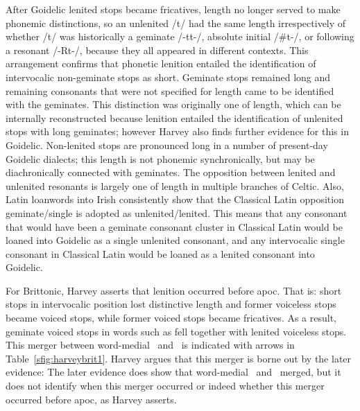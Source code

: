 After Goidelic lenited stops became fricatives, length no longer served to make phonemic distinctions, so an unlenited /t/ had the same length irrespectively of whether /t/ was historically a geminate /-tt-/, absolute initial /\#t-/, or following a resonant /-Rt-/, because they all appeared in different contexts. This arrangement confirms that phonetic lenition entailed the identification of intervocalic non-geminate stops as short. Geminate stops remained long and remaining consonants that were not specified for length came to be identified with the geminates. This distinction was originally one of length, which can be internally reconstructed because lenition entailed the identification of unlenited stops with long geminates; however Harvey also finds further evidence for this in Goidelic. Non-lenited stops are pronounced long in a number of present-day Goidelic dialects; this length is not phonemic synchronically, but may be diachronically connected with geminates. The opposition between lenited and unlenited resonants is largely one of length in multiple branches of Celtic. Also, Latin loanwords into Irish consistently show that the Classical Latin opposition geminate/single is adopted as unlenited/lenited. This means that any consonant that would have been a geminate consonant cluster in Classical Latin would be loaned into Goidelic as a single unlenited consonant, and any intervocalic single consonant in Classical Latin would be loaned as a lenited consonant into Goidelic.

For Brittonic, Harvey asserts that  lenition  occurred before \gls{apoc}. That is: short stops in intervocalic position lost distinctive length and former voiceless stops became voiced stops, while former voiced stops became fricatives. As a result, geminate voiced stops in words such as  fell together with lenited voiceless stops. This merger between word-medial \xD\ and \lT\ is indicated with arrows in Table~\ref{sfig:harveybrit1}. Harvey argues that this merger is borne out by the later evidence:
The later evidence does show that word-medial \xD\ and \lT\ merged, but it does not identify when this merger occurred or indeed whether this merger occurred before \gls{apoc}, as Harvey asserts. 

